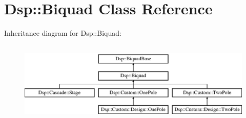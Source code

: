 \hypertarget{classDsp_1_1Biquad}{\section{Dsp\-:\-:Biquad Class Reference}
\label{classDsp_1_1Biquad}
}
Inheritance diagram for Dsp\-:\-:Biquad\-:\begin{figure}[H]
\begin{center}
\leavevmode
\includegraphics[height=3.950617cm]{classDsp_1_1Biquad}
\end{center}
\end{figure}
